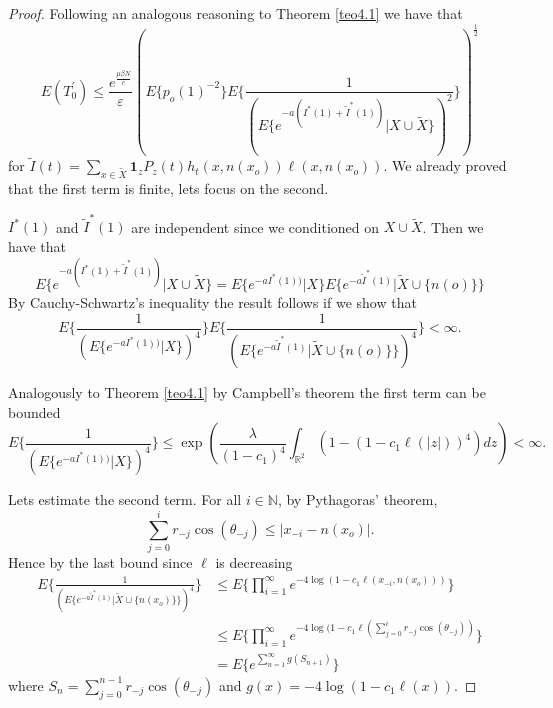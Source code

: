 \begin{proof}
Following an analogous reasoning to Theorem \ref{teo4.1} we have that
$$E(T^{'}_0)\leq\frac{e^{\frac{\mu\beta N}{c}}}{\varepsilon}(E\lbrace p_o(1)^{-2}\rbrace E\lbrace\frac{1}{(E\lbrace e^{-a(I^*(1)+\widetilde{I}^*(1))}\vert X\cup\widetilde{ X}\rbrace)^2}\rbrace)^{\frac{1}{2}}
$$ for $\widetilde{I}(t)=\sum_{x\in\widetilde{X}}\textbf{1}_{z}P_z(t)h_{t}(x,n(x_o))\ell(x,n(x_o)).$ We already proved that the first term is finite, lets focus on the second.

$I^{*}(1)$ and $\widetilde{I}^*(1)$ are independent since we conditioned on $X\cup\widetilde{X}$. Then we have that
$$E\lbrace e^{-a(I^*(1)+\widetilde{I}^*(1))}\vert X\cup\widetilde{X}\rbrace=E\lbrace e^{-aI^*(1))}\vert X\rbrace E\lbrace e^{-a\widetilde{I}^*(1)}\vert\widetilde{X}\cup\lbrace n(o)\rbrace\rbrace$$ 
By Cauchy-Schwartz's inequality the result follows if we show that
$$E\lbrace\frac{1}{(E\lbrace e^{-aI^*(1))}\vert X\rbrace)^4}\rbrace E\lbrace\frac{1}{(E\lbrace e^{-a\widetilde{I}^*(1)}\vert\widetilde{X}\cup\lbrace n(o)\rbrace\rbrace)^4}\rbrace <\infty.$$

Analogously to Theorem \ref{teo4.1} by Campbell's theorem the first term can be bounded
$$E\lbrace\frac{1}{(E\lbrace e^{-aI^*(1))}\vert X\rbrace)^4}\rbrace\leq \exp(\frac{\lambda}{(1-c_1)^4}\int_{\mathbb{R}^2}(1-(1-c_1\ell(\vert z\vert))^4)dz)<\infty. $$ 


Lets estimate the second term.  For all $i\in\mathbb{N}$, by Pythagoras' theorem, $$\sum_{j=0}^{i}r_{-j}\cos(\theta_{-j})\leq \vert x_{-i}-n(x_o)\vert.$$ Hence by the last bound since $\ell$ is decreasing
\begin{align*}
E\lbrace\frac{1}{(E\lbrace e^{-a\widetilde{I}^*(1)}\vert\widetilde{X}\cup\lbrace n(x_o)\rbrace\rbrace)^4}\rbrace&\leq E\lbrace\prod_{i=1}^\infty e^{-4\log(1-c_1\ell(x_{-i},n(x_o)))}\rbrace\\
&\leq E\lbrace\prod_{i=1}^\infty e^{-4\log(1-c_1\ell(\sum_{j=0}^{i}r_{-j}\cos(\theta_{-j}))}\rbrace\\
&=E\lbrace e^{\sum_{n=1}^\infty g(S_{n+1})}\rbrace
\end{align*}
where $S_n=\sum_{j=0}^{n-1}r_{-j}\cos(\theta_{-j})$ and $g(x)=-4\log(1-c_1\ell(x))$. 


\end{proof}
